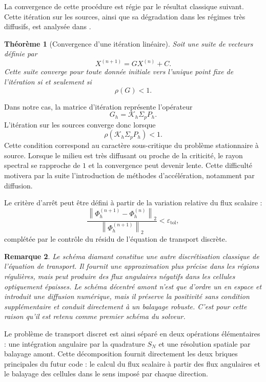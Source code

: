 \documentclass{article}
\newtheorem{theorem}{Théorème}[section]
\newtheorem{remark}[theorem]{Remarque}
\begin{document}
La convergence de cette procédure est régie par le résultat classique suivant. Cette itération sur les sources, ainsi que sa dégradation dans les régimes très diffusifs, est analysée dans \cite[chap.~5, section~5.2.3]{Allaire2018}.

\begin{theorem}[Convergence d'une itération linéaire]
    Soit une suite de vecteurs définie par
    \[ X^{(n+1)}=GX^{(n)}+C. \]
    Cette suite converge pour toute donnée initiale vers l'unique point fixe de l'itération si et seulement si
    \[ \rho(G)<1. \]
\end{theorem}

Dans notre cas, la matrice d'itération représente l'opérateur
\[
    G_h = \mathcal K_h\Sigma_pP_h.
\]
L'itération sur les sources converge donc lorsque
\begin{equation}
    \rho\!\left( \mathcal K_h\Sigma_pP_h \right)<1.
    \label{eq:condition-convergence-source-iteration}
\end{equation}
Cette condition correspond au caractère sous-critique du problème stationnaire à source. Lorsque le milieu est très diffusant ou proche de la criticité, le rayon spectral se rapproche de $1$ et la convergence peut devenir lente. Cette difficulté motivera par la suite l'introduction de méthodes d'accélération, notamment par diffusion.

Le critère d'arrêt peut être défini à partir de la variation relative du flux scalaire :
\[
    \frac{ \left\| \Phi_h^{(n+1)}-\Phi_h^{(n)} \right\|_2}
    {\left\|\Phi_h^{(n+1)}\right\|_2}
    < \varepsilon_{\mathrm{tol}},
\]
complétée par le contrôle du résidu de l'équation de transport discrète.

\begin{remark}
    Le schéma diamant constitue une autre discrétisation classique de l'équation de transport. Il fournit une approximation plus précise dans les régions régulières, mais peut produire des flux angulaires négatifs dans les cellules optiquement épaisses. Le schéma décentré amont n'est que d'ordre un en espace et introduit une diffusion numérique, mais il préserve la positivité sans condition supplémentaire et conduit directement à un balayage robuste. C'est pour cette raison qu'il est retenu comme premier schéma du solveur.
\end{remark}

Le problème de transport discret est ainsi séparé en deux opérations élémentaires : une intégration angulaire par la quadrature $S_N$ et une résolution spatiale par balayage amont. Cette décomposition fournit directement les deux briques principales du futur code : le calcul du flux scalaire à partir des flux angulaires et le balayage des cellules dans le sens imposé par chaque direction.
\end{document}
